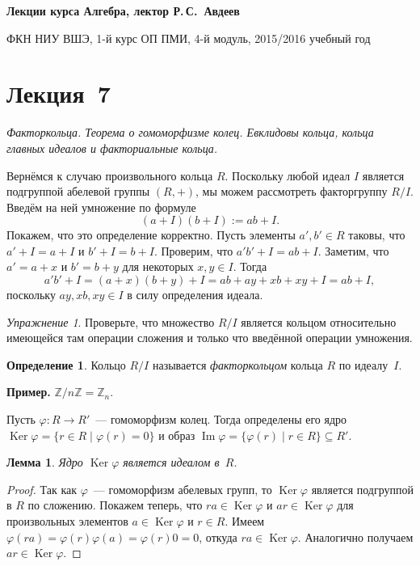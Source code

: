 \documentclass[a4paper,10pt]{amsart}
\newcommand{\Ker}{\mathop{\mathrm{Ker}}}
\renewcommand{\Im}{\mathop{\mathrm{Im}}}
\def\ZZ{{\mathbb Z}}%
\newtheorem{lemma}{Лемма}
\theoremstyle{definition}
\newtheorem{definition}{Определение}
\theoremstyle{remark}
\newtheorem{exercise}{Упражнение}
\begin{document}
%
\sloppy
%
\centerline{\large \bf Лекции курса \guillemotleft
Алгебра\guillemotright{}, лектор Р.\,С.~Авдеев}

\smallskip

\centerline{\large ФКН НИУ ВШЭ, 1-й курс ОП ПМИ, 4-й модуль,
2015/2016 учебный год}


\bigskip

\section*{Лекция~7}

\medskip

{\it Факторкольца. Теорема о
гомоморфизме колец. Евклидовы кольца, кольца главных идеалов и факториальные
кольца.}

\medskip



Вернёмся к случаю произвольного кольца $R$. Поскольку любой идеал
$I$ является подгруппой абелевой группы $(R,+)$, мы можем
рассмотреть факторгруппу $R/I$. Введём на ней умножение по формуле
$$
(a+I)(b+I) := ab + I.
$$
Покажем, что это определение корректно. Пусть элементы $a',b' \in R$
таковы, что $a' + I = a + I$ и $b' + I = b + I$. Проверим, что $a'b'
+ I = ab + I$. Заметим, что $a' = a + x$ и $b' = b + y$ для
некоторых $x, y \in I$. Тогда
$$
a'b' + I = (a + x)(b + y) + I = ab + ay + xb + xy + I = ab + I,
$$
поскольку $ay, xb, xy \in I$ в силу определения идеала.

\begin{exercise}
Проверьте, что множество $R/I$ является кольцом относительно
имеющейся там операции сложения и только что введённой операции
умножения.
\end{exercise}

\begin{definition}
Кольцо $R/I$ называется {\it факторкольцом} кольца $R$ по
идеалу~$I$.
\end{definition}

\textbf{Пример.} $\ZZ / n \ZZ = \ZZ_n$.

Пусть $\varphi\colon R\to R'$~--- гомоморфизм колец. Тогда
определены его ядро $\Ker \varphi = \lbrace r \in R \mid \varphi(r)
= 0 \rbrace$ и образ $\Im \varphi = \lbrace \varphi(r) \mid r \in R
\rbrace \subseteq R'$.

\begin{lemma}
Ядро $\Ker \varphi$ является идеалом в~$R$.
\end{lemma}

\begin{proof}
Так как $\varphi$~--- гомоморфизм абелевых групп, то $\Ker \varphi$
является подгруппой в $R$ по сложению. Покажем теперь, что $ra \in
\Ker \varphi$ и $ar \in \Ker \varphi$ для произвольных элементов $a
\in \Ker \varphi$ и $r \in R$. Имеем $\varphi(ra) = \varphi(r)
\varphi(a) = \varphi(r) 0 = 0$, откуда $ra \in \Ker \varphi$.
Аналогично получаем $ar \in \Ker \varphi$.
\end{proof}
\end{document}
